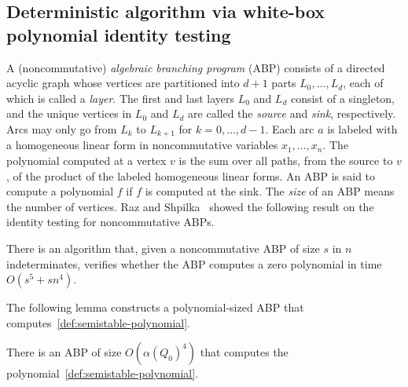 \documentclass[a4paper,11pt]{article}
\numberwithin{equation}{section}
\begin{document}
\subsection{Deterministic algorithm via white-box polynomial identity testing}\label{sec:deterministic}
A (noncommutative) \emph{algebraic branching program} (ABP) consists of a directed acyclic graph whose vertices are partitioned into $d+1$ parts $L_0, \dotsc, L_d$, each of which is called a \emph{layer}.
The first and last layers $L_0$ and $L_d$ consist of a singleton, and the unique vertices in $L_0$ and $L_d$ are called the \emph{source} and \emph{sink}, respectively.
Arcs may only go from $L_k$ to $L_{k+1}$ for $k = 0, \dotsc, d-1$.
Each arc $a$ is labeled with a homogeneous linear form in noncommutative variables $x_1, \dotsc, x_n$.
The polynomial computed at a vertex $v$ is the sum over all paths, from the source to $v$, of the product of the labeled homogeneous linear forms.
An ABP is said to compute a polynomial $f$ if $f$ is computed at the sink.
The \emph{size} of an ABP means the number of vertices.
Raz and Shpilka~\cite{Raz2005} showed the following result on the identity testing for noncommutative ABPs.

\begin{theorem}\label{thm:abp-identity-test}
    There is an algorithm that, given a noncommutative ABP of size $s$ in $n$ indeterminates, verifies whether the ABP computes a zero polynomial in time $O(s^5 + sn^4)$.
\end{theorem}

The following lemma constructs a polynomial-sized ABP that computes~\eqref{def:semistable-polynomial}.

\begin{lemma}\label{lem:into-abp}
    There is an ABP of size $O({\alpha(Q_0)}^4)$ that computes the polynomial~\eqref{def:semistable-polynomial}.
\end{lemma}
\end{document}
